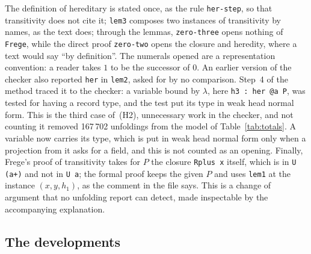 \documentclass[11pt]{article}
\newcommand{\kw}[1]{\texttt{#1}}
\begin{document}
The definition of hereditary is stated once, as the rule
\kw{her-step}, so that transitivity does not cite it; \kw{lem3} composes
two instances of transitivity by names, as the text does; through the
lemmas, \kw{zero-three} opens nothing of \kw{Frege}, while the direct
proof \kw{zero-two} opens the closure and heredity, where a text would
say ``by definition''. The numerals opened are a representation
convention: a reader takes $1$ to be the successor of $0$. An earlier
version of the checker also reported \kw{her} in \kw{lem2}, asked for by
no comparison. Step~4 of the method traced it to the checker: a
variable bound by $\lambda$, here \kw{h3 : her @a P}, was tested for
having a record type, and the test put its type in weak head normal
form. This is the third case of~(H2), unnecessary work in the checker,
and not counting it removed 167\,702 unfoldings from the model of
Table~\ref{tab:totals}. A variable now carries its type, which is put
in weak head normal form only when a projection from it asks for a
field, and this is not counted as an opening. Finally,
Frege's proof of transitivity takes for $P$ the closure
\kw{Rplus x} itself, which is in \kw{U (a+)} and not in \kw{U a}; the
formal proof keeps the given $P$ and uses \kw{lem1} at the instance
$(x,y,h_1)$, as the comment in the file says. This is a change of
argument that no unfolding report can detect, made inspectable by
the accompanying explanation.

\subsection{The developments}
\end{document}
